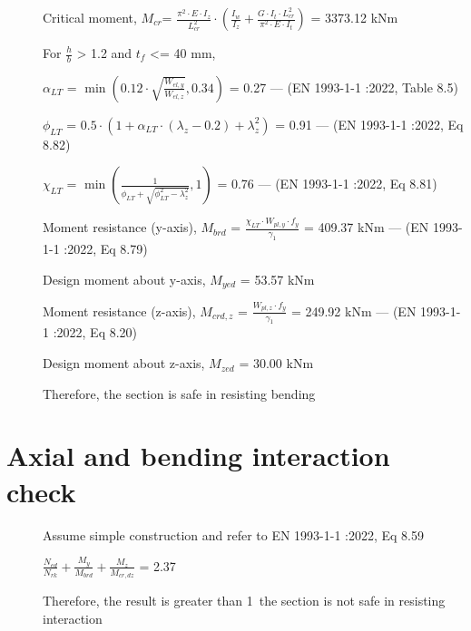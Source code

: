 \documentclass[
  letterpaper,
  DIV=11,
  numbers=noendperiod]{scrartcl}
\begin{document}
\begin{description}
    \item[]Critical moment, $M_{cr}$= $\frac{\pi^{2} \cdot E \cdot I_{z}}{L_{cr}^{2}} \cdot \left( \frac{I_{w}}{I_{z}} + \frac{G \cdot I_{t} \cdot L_{cr}^{2}}{\pi^{2} \cdot E \cdot I_{t}} \right)$ = 3373.12 kNm
    \item[]For $\frac{h}{b}$ > 1.2 and $t_{f}$ <= 40 mm, 
    \item[]$\alpha_{LT}$ = $\min(0.12\cdot \sqrt{\frac{W_{el,y}}{W_{el,z}}}, 0.34)$ = 0.27 --- (EN 1993-1-1 :2022, Table 8.5)
    \item[]$\phi_{LT}$ = $0.5\cdot(1 + \alpha_{LT}\cdot(\lambda_z - 0.2) + \lambda_z^{2})$ = 0.91 --- (EN 1993-1-1 :2022, Eq 8.82)
    \item[]$\chi_{LT}$ = $\min(\frac{1}{\phi_{LT} + \sqrt{\phi_{LT}^{2} - \lambda_z^{2}}},1)$ = 0.76 --- (EN 1993-1-1 :2022, Eq 8.81)
    \item[]Moment resistance (y-axis), $M_{brd}$ = $\frac{\chi_{LT} \cdot W_{pl,y} \cdot f_{y}}{\gamma_1}$ = 409.37 kNm --- (EN 1993-1-1 :2022, Eq 8.79)
    \item[]Design moment about y-axis, $M_{yed}$ = 53.57 kNm
    \item[]Moment resistance (z-axis), $M_{crd,z}$ = $\frac{W_{pl,z} \cdot f_{y}}{\gamma_1}$ = 249.92 kNm --- (EN 1993-1-1 :2022, Eq 8.20)
    \item[]Design moment about z-axis, $M_{zed}$ = 30.00 kNm
    \item[]Therefore, the section is safe in resisting bending
\end{description}

\section{Axial and bending interaction
check}\label{axial-and-bending-interaction-check}

\begin{description}
    \item[]Assume simple construction and refer to EN 1993-1-1 :2022, Eq 8.59 
    \item[]$\frac{N_{ed}}{N_{rk}} + \frac{M_{y}}{M_{brd}} + \frac{M_{z}}{M_{cr,dz}}$ = 2.37
    \item[]Therefore, the result is greater than 1\, the section is not safe in resisting interaction
\end{description}
\end{document}
